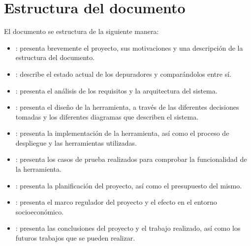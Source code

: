 \section{Estructura del documento}\label{sec:estructura-documento}
El documento se estructura de la siguiente manera:
\begin{itemize}
  \item {}: presenta brevemente el proyecto, sus motivaciones y una descripción de la estructura del documento.
  \item {}: describe el estado actual de los depuradores y comparándolos entre sí.
  \item {}: presenta el análisis de los requisitos y la arquitectura del sistema.
  \item {}: presenta el diseño de la herramienta, a través de las diferentes decisiones tomadas y los diferentes diagramas que describen el sistema.
  \item {}: presenta la implementación de la herramienta, así como el proceso de despliegue y las herramientas utilizadas.
  \item {}: presenta los casos de prueba realizados para comprobar  la funcionalidad de la herramienta.
  \item {}: presenta la planificación del proyecto, así como el presupuesto del mismo.
  \item {}: presenta el marco regulador del proyecto y el efecto en el entorno socioeconómico. 
  \item {}: presenta las conclusiones del proyecto y el trabajo realizado, así como los futuros trabajos que se pueden realizar.
\end{itemize}